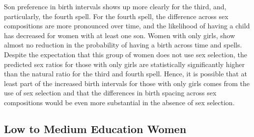 \documentclass[12pt,letterpaper]{article}
\begin{document}
Son preference in birth intervals shows up more clearly for the third, and, particularly, 
the fourth spell.
For the fourth spell, the difference across sex compositions are more pronounced over time, 
and the likelihood of having a child has decreased for women with at least one son.
Women with only girls, show almost no reduction in the probability of having a birth 
across time and spells.
Despite the expectation that this group of women does not use sex selection, the predicted 
sex ratios for those with only girls are statistically significantly higher than the 
natural ratio for the third and fourth spell.
Hence, it is possible that at least part of the increased  birth intervals for those
with only girls comes from the use of sex selection and that the differences in birth 
spacing across sex compositions would be even more substantial in the absence of sex 
selection.


\subsection{Low to Medium Education Women}


\end{document}

